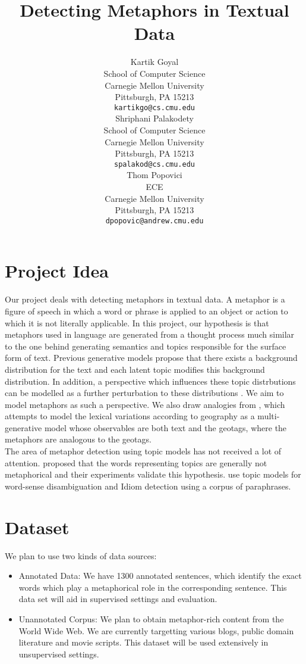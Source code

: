\documentclass{article} %
\title{Detecting Metaphors in Textual Data}
\author{
Kartik Goyal\\
School of Computer Science\\
Carnegie Mellon University\\
Pittsburgh, PA 15213 \\
\texttt{kartikgo@cs.cmu.edu} \\
\And
Shriphani Palakodety \\
School of Computer Science \\
Carnegie Mellon University\\
Pittsburgh, PA 15213 \\
\texttt{spalakod@cs.cmu.edu} \\
\AND
Thom Popovici \\
ECE\\
Carnegie Mellon University\\
Pittsburgh, PA 15213 \\
\texttt{dpopovic@andrew.cmu.edu} \\
}
\begin{document}
\maketitle
\section{Project Idea}
Our project deals with detecting metaphors in textual data. A metaphor is a figure of speech in which a word or phrase is applied to an object or action to which it is not literally applicable. In this project, our hypothesis is that metaphors used in language are generated from a thought process much similar to the one behind generating semantics and topics responsible for the surface form of text. Previous generative models propose that there exists a background distribution for the text and each latent topic modifies this background distribution. In addition, a perspective which influences these topic distrbutions can be modelled as a further perturbation to these distributions \cite{eisenstein2011sparse}. We aim to model metaphors as such a perspective. We also draw analogies from \cite{eisenstein2010latent}, which attempts to model the lexical variations according to geography as a multi-generative model whose observables are both text and the geotags, where the metaphors are analogous to the geotags.\\
The area of metaphor detection using topic models has not received a lot of attention. \cite{klebanov2009discourse} proposed that the words representing topics are generally not metaphorical and their experiments validate this hypothesis. \cite{li2010topic} use topic models for word-sense disambiguation and Idiom detection using a corpus of paraphrases.


\section{Dataset}
We plan to use two kinds of data sources:
\begin{itemize}
\item Annotated Data: We have 1300 annotated sentences, which identify the exact words which play a metaphorical role in the corresponding sentence. This data set will aid in supervised settings and evaluation.
\item Unannotated Corpus: We plan to obtain metaphor-rich content from the World Wide Web. We are currently targetting various blogs, public domain literature and movie scripts. This dataset will be used extensively in unsupervised settings.
\end{itemize}
\end{document}
